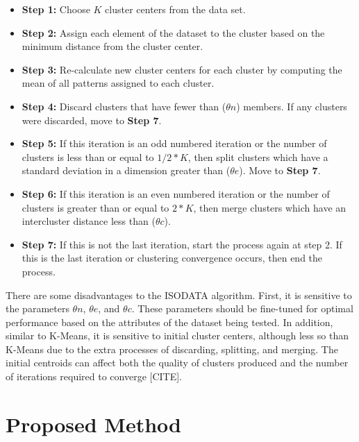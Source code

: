\documentclass[a4paper,10pt]{article}
\begin{document}
\begin{itemize}
      \item \textbf{Step 1:} Choose $K$ cluster centers from the data set.
      \item \textbf{Step 2:} Assign each element of the dataset to the cluster
            based on the minimum distance from the cluster center.
      \item \textbf{Step 3:} Re-calculate new cluster centers for each cluster
            by computing the mean of all patterns assigned to each cluster.
      \item \textbf{Step 4:} Discard clusters that have fewer than ($\theta n$)
            members. If any clusters were discarded, move to \textbf{Step 7}.
      \item \textbf{Step 5:} If this iteration is an odd numbered iteration or
            the number of clusters is less than or equal to  $1/2 * K$, then
            split clusters which have a standard deviation in a dimension
            greater than ($\theta e$). Move to \textbf{Step 7}.
      \item \textbf{Step 6:} If this iteration is an even numbered iteration or
            the number of clusters is greater than or equal to $2 * K$, then
            merge clusters which have an intercluster distance less than
            ($\theta c$).
      \item \textbf{Step 7:} If this is not the last iteration, start the
            process again at step 2. If this is the last iteration or clustering
            convergence occurs, then end the process.
\end{itemize}

There are some disadvantages to the ISODATA algorithm. First, it is sensitive to
the parameters $\theta n$, $\theta e$, and $\theta c$. These parameters should
be fine-tuned for optimal performance based on the attributes of the dataset
being tested. In addition, similar to K-Means, it is sensitive to initial
cluster centers, although less so than K-Means due to the extra processes of
discarding, splitting, and merging. The initial centroids can affect both the
quality of clusters produced and the number of iterations required to converge
      [CITE].


\section{Proposed Method}
\end{document}
